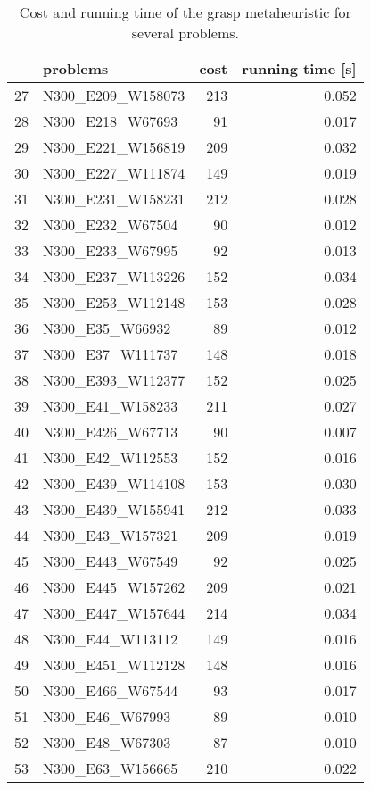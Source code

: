 \begin{table}[H]
\centering
\begin{tabular}{llrr}
\toprule
{} &            problems &  cost &  running time [s] \\
\midrule
27 &   N300\_E209\_W158073 &   213 &             0.052 \\
28 &    N300\_E218\_W67693 &    91 &             0.017 \\
29 &   N300\_E221\_W156819 &   209 &             0.032 \\
30 &   N300\_E227\_W111874 &   149 &             0.019 \\
31 &   N300\_E231\_W158231 &   212 &             0.028 \\
32 &    N300\_E232\_W67504 &    90 &             0.012 \\
33 &    N300\_E233\_W67995 &    92 &             0.013 \\
34 &   N300\_E237\_W113226 &   152 &             0.034 \\
35 &   N300\_E253\_W112148 &   153 &             0.028 \\
36 &     N300\_E35\_W66932 &    89 &             0.012 \\
37 &    N300\_E37\_W111737 &   148 &             0.018 \\
38 &   N300\_E393\_W112377 &   152 &             0.025 \\
39 &    N300\_E41\_W158233 &   211 &             0.027 \\
40 &    N300\_E426\_W67713 &    90 &             0.007 \\
41 &    N300\_E42\_W112553 &   152 &             0.016 \\
42 &   N300\_E439\_W114108 &   153 &             0.030 \\
43 &   N300\_E439\_W155941 &   212 &             0.033 \\
44 &    N300\_E43\_W157321 &   209 &             0.019 \\
45 &    N300\_E443\_W67549 &    92 &             0.025 \\
46 &   N300\_E445\_W157262 &   209 &             0.021 \\
47 &   N300\_E447\_W157644 &   214 &             0.034 \\
48 &    N300\_E44\_W113112 &   149 &             0.016 \\
49 &   N300\_E451\_W112128 &   148 &             0.016 \\
50 &    N300\_E466\_W67544 &    93 &             0.017 \\
51 &     N300\_E46\_W67993 &    89 &             0.010 \\
52 &     N300\_E48\_W67303 &    87 &             0.010 \\
53 &    N300\_E63\_W156665 &   210 &             0.022 \\
\bottomrule
\end{tabular}
\caption{Cost and running time of the grasp metaheuristic for several problems.}
\label{table:greedy-medium-results-II}
\end{table}

